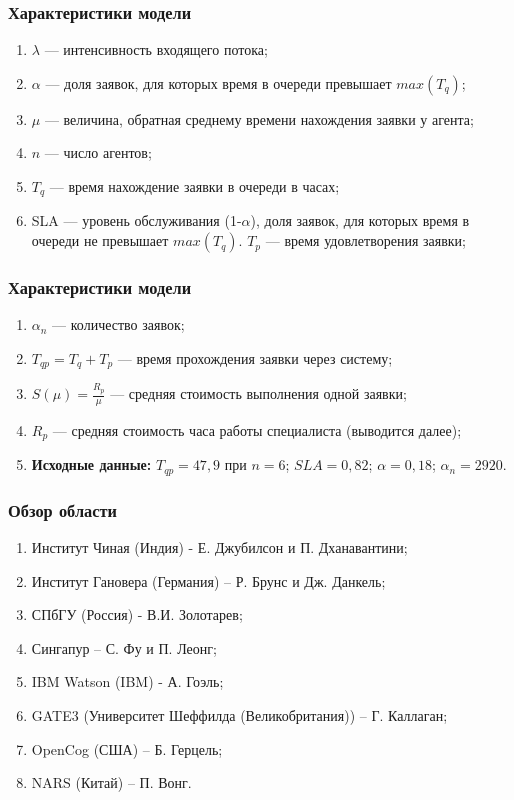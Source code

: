 \documentclass[14pt]{beamer}
\begin{document}
\begin{frame}
\frametitle{Характеристики модели}
\begin{enumerate}
 \item $\lambda$ --- интенсивность входящего потока;
    \item $\alpha$ --- доля заявок, для которых время в очереди превышает $max(T_q)$;       
    \item $\mu$ --- величина, обратная среднему времени нахождения заявки у агента;
	\item  $n$ --- число агентов;
	\item $T_q$ --- время нахождение заявки в очереди в часах;
	\item SLA --- уровень обслуживания (1-$\alpha$), доля заявок, для которых время в очереди не превышает $max(T_q)$. $T_p$ --- время удовлетворения заявки;
 	

\end{enumerate}
\end{frame}

\begin{frame}
\frametitle{Характеристики модели}
\begin{enumerate}
 \item $\alpha_n$ --- количество заявок;
 \item	$T_{qp}=T_q+T_p$ --- время прохождения заявки через систему;
 \item	$S(\mu)= \frac{R_p}{\mu} $ --- средняя стоимость выполнения одной заявки;
 \item $R_p$ --- средняя стоимость часа работы специалиста (выводится далее);
 \item \textbf{Исходные данные:} $T_{qp}=47,9$ при $n=6$; $SLA=0,82$; $\alpha=0,18$;  $\alpha_n=2920$. 
\end{enumerate}
\end{frame}

\begin{frame}
\frametitle{Обзор области}
\begin{enumerate}
 \item Институт Чиная (Индия) - Е. Джубилсон и П. Дханавантини;
 \item Институт Гановера (Германия) – Р. Брунс и Дж. Данкель;
 \item СПбГУ (Россия) - В.И. Золотарев;
 \item Сингапур – С. Фу и П. Леонг;
 \item IBM Watson (IBM) - А. Гоэль;
 \item GATE3 (Университет Шеффилда (Великобритания)) – Г. Каллаган;
 \item OpenCog (США) –  Б. Герцель;
 \item NARS (Китай) – П. Вонг.
\end{enumerate}
\end{frame}
\end{document}
